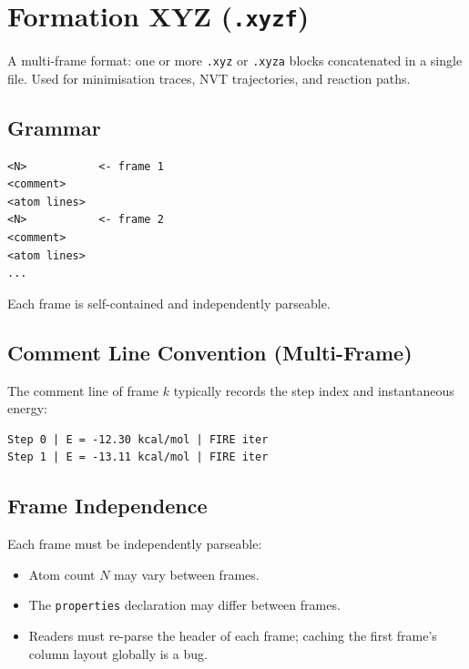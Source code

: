 \documentclass[12pt, a4paper, oneside]{article}
\begin{document}
\section{Formation XYZ (\texttt{.xyzf})}
\label{sec:xyzf}

A multi-frame format: one or more \texttt{.xyz} or \texttt{.xyza} blocks
concatenated in a single file.  Used for minimisation traces, NVT
trajectories, and reaction paths.

\subsection{Grammar}

\begin{lstlisting}[language={},frame=single]
<N>           <- frame 1
<comment>
<atom lines>
<N>           <- frame 2
<comment>
<atom lines>
...
\end{lstlisting}

Each frame is self-contained and independently parseable.

\subsection{Comment Line Convention (Multi-Frame)}

The comment line of frame $k$ typically records the step index and
instantaneous energy:

\begin{lstlisting}[language={},frame=single]
Step 0 | E = -12.30 kcal/mol | FIRE iter
Step 1 | E = -13.11 kcal/mol | FIRE iter
\end{lstlisting}

\subsection{Frame Independence}

Each frame must be independently parseable:

\begin{itemize}
  \item Atom count $N$ may vary between frames.
  \item The \texttt{properties} declaration may differ between frames.
  \item Readers must re-parse the header of each frame; caching the
        first frame's column layout globally is a bug.
\end{itemize}
\end{document}
